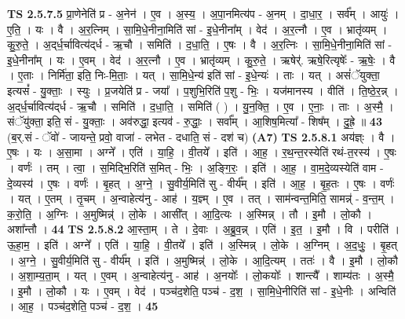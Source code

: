 \documentclass[17pt]{extarticle}
\begin{document}
                                \textbf{ TS 2.5.7.5} \newline
                  प्रा॒णेनेति॑ प्र - अ॒नेन॑ । ए॒व । अ॒स्य॒ । अ॒पा॒नमित्य॑प - अ॒नम् । दा॒धा॒र॒ । सर्व᳚म् । आयुः॑ । ए॒ति॒ । यः । वै । अ॒र॒त्निम् । सा॒मि॒धे॒नीना॒मिति॑ सां - इ॒धे॒नीना᳚म् । वेद॑ । अ॒र॒त्नौ । ए॒व । भ्रातृ॑व्यम् । कु॒रु॒ते॒ । अ॒द्‌र्ध॒र्चावित्य॑द्‌र्ध - ऋ॒चौ । समिति॑ । द॒धा॒ति॒ । ए॒षः । वै । अ॒र॒त्निः । सा॒मि॒धे॒नीना॒मिति॑ सां - इ॒धे॒नीना᳚म् । यः । ए॒वम् । वेद॑ । अ॒र॒त्नौ । ए॒व । भ्रातृ॑व्यम् । कु॒रु॒ते॒ । ऋषेर्॑. ऋषे॒रित्यृषेः᳚ - ऋ॒षेः॒ । वै । ए॒ताः । निर्मि॑ता॒ इति॒ निः-मि॒ताः॒ । यत् । सा॒मि॒धे॒न्य॑ इति॑ सां - इ॒धे॒न्यः॑ । ताः । यत् । असं॑ॅयुक्ता॒ इत्यसं᳚ - यु॒क्ताः॒ । स्युः । प्र॒जयेति॑ प्र - जया᳚ । प॒शुभि॒रिति॑ प॒शु - भिः॒ । यज॑मानस्य । वीति॑ । ति॒ष्ठे॒र॒न्न् । अ॒द्‌र्ध॒र्चावित्य॑द्‌र्ध - ऋ॒चौ । समिति॑ । द॒धा॒ति॒ । समिति॑ ( ) । यु॒न॒क्ति॒ । ए॒व । ए॒नाः॒ । ताः । अ॒स्मै॒ । संॅयु॑क्ता॒ इति॒ सं - यु॒क्ताः॒ । अव॑रुद्धा॒ इत्यव॑ - रु॒द्धाः॒ । सर्वा᳚म् । आ॒शिष॒मित्या᳚ - शिष᳚म् । दु॒ह्रे॒ ॥ \textbf{  43 } \newline
                  \newline
                      (ब॒र्.सं - ॅवो॑ - जायन्ते॒ प्रवो॒ वाजा॑ - लभेत - दधाति॒ सं - दश॑ च)  \textbf{(A7)} \newline \newline
                                \textbf{ TS 2.5.8.1} \newline
                  अय॑ज्ञ्ः । वै । ए॒षः । यः । अ॒सा॒मा । अग्ने᳚ । एति॑ । या॒हि॒ । वी॒तये᳚ । इति॑ । आ॒ह॒ । र॒थ॒न्त॒रस्येति॑ रथं-त॒रस्य॑ । ए॒षः । वर्णः॑ । तम् । त्वा॒ । स॒मिद्भि॒रिति॑ स॒मित् - भिः॒ । अ॒ङ्गि॒रः॒ । इति॑ । आ॒ह॒ । वा॒म॒दे॒व्यस्येति॑ वाम - दे॒व्यस्य॑ । ए॒षः । वर्णः॑ । बृ॒हत् । अ॒ग्ने॒ । सु॒वीर्य॒मिति॑ सु - वीर्य᳚म् । इति॑ । आ॒ह॒ । बृ॒ह॒तः । ए॒षः । वर्णः॑ । यत् । ए॒तम् । तृ॒चम् । अ॒न्वाहेत्य॑नु - आह॑ । य॒ज्ञ्म् । ए॒व । तत् । साम॑न्वन्त॒मिति॒ सामन्न्॑ - व॒न्त॒म् । क॒रो॒ति॒ । अ॒ग्निः । अ॒मुष्मिन्न्॑ । लो॒के । आसी᳚त् । आ॒दि॒त्यः । अ॒स्मिन्न् । तौ । इ॒मौ । लो॒कौ । अशा᳚न्तौ । \textbf{  44} \newline
                  \newline
                                \textbf{ TS 2.5.8.2} \newline
                  आ॒स्ता॒म् । ते । दे॒वाः । अ॒ब्रु॒व॒न्न् । एति॑ । इ॒त॒ । इ॒मौ । वि । परीति॑ । ऊ॒हा॒म॒ । इति॑ । अग्ने᳚ । एति॑ । या॒हि॒ । वी॒तये᳚ । इति॑ । अ॒स्मिन्न् । लो॒के । अ॒ग्निम् । अ॒द॒धुः॒ । बृ॒हत् । अ॒ग्ने॒ । सु॒वीर्य॒मिति॑ सु - वीर्य᳚म् । इति॑ । अ॒मुष्मिन्न्॑ । लो॒के । आ॒दि॒त्यम् । ततः॑ । वै । इ॒मौ । लो॒कौ । अ॒शा॒म्य॒ता॒म् । यत् । ए॒वम् । अ॒न्वाहेत्य॑नु - आह॑ । अ॒नयोः᳚ । लो॒कयोः᳚ । शान्त्यै᳚ । शाम्य॑तः । अ॒स्मै॒ । इ॒मौ । लो॒कौ । यः । ए॒वम् । वेद॑ । पञ्च॑द॒शेति॒ पञ्च॑ - द॒श॒ । सा॒मि॒धे॒नीरिति॑ सां - इ॒धे॒नीः । अन्विति॑ । आ॒ह॒ । पञ्च॑द॒शेति॒ पञ्च॑ - द॒श॒ । \textbf{  45} \newline
\end{document}

